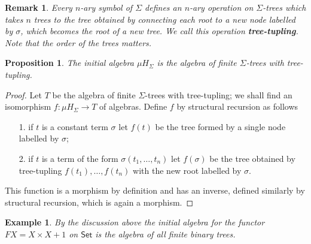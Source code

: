 \documentclass[letterpaper, 11pt, oneside]{memoir}
\theoremstyle{myteo}
\newtheorem{proposition}[theorem]{Proposition}
\newtheorem{example}[theorem]{Example}
\newtheorem{remark}[theorem]{Remark}
\numberwithin{equation}{section}
\newcommand{\marginnote}[1]{\marginpar{\footnotesize #1}}
\newcommand{\Set}{\textsf{Set}}
\begin{document}
\begin{remark}
  Every \(n\)-ary symbol of \(\Sigma\) defines an \(n\)-ary operation on \(\Sigma\)-trees which takes \(n\) trees to the tree obtained by connecting each root to a new node labelled by \(\sigma\), which becomes the root of a new tree.
  We call this operation \textbf{tree-tupling}.\marginnote{tree-tupling}
  Note that the order of the trees matters.
\end{remark}

\begin{proposition}
  The initial algebra \(\mu H_\Sigma\) is the algebra of finite \(\Sigma\)-trees with tree-tupling.
\end{proposition}

\begin{proof}
  Let \(T\) be the algebra of finite \(\Sigma\)-trees with tree-tupling; we shall find an isomorphism \(f \colon \mu H_\Sigma \to T\) of algebras.
  Define \(f\) by structural recursion as follows
  \begin{itemize}
  \item[1.] if \(t\) is a constant term \(\sigma\) let \(f(t)\) be the tree formed by a single node labelled by \(\sigma\);
  \item[2.] if \(t\) is a term of the form \(\sigma(t_1, \ldots, t_n)\) let \(f(\sigma)\) be the tree obtained by tree-tupling \(f(t_1), \ldots, f(t_n)\) with the new root labelled by \(\sigma\).
  \end{itemize}
  This function is a morphism by definition and has an inverse, defined similarly by structural recursion, which is again a morphism.
\end{proof}

\begin{example}
  \label{ex:finite_binary_trees}
  By the discussion above the initial algebra for the functor \(FX = X \times X + 1\) on \(\Set\) is the algebra of all finite binary trees.
\end{example}
\end{document}
